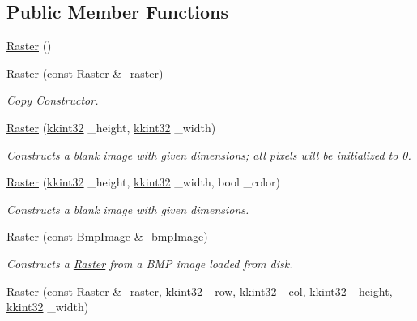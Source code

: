 \subsection*{Public Member Functions}
\begin{DoxyCompactItemize}
\item 
\hyperlink{class_k_k_b_1_1_raster_a19ec88efff547c1fcda863172fef620b}{Raster} ()
\item 
\hyperlink{class_k_k_b_1_1_raster_a711646f50218428dc3ce40eb2b7014c9}{Raster} (const \hyperlink{class_k_k_b_1_1_raster}{Raster} \&\+\_\+raster)
\begin{DoxyCompactList}\small\item\em Copy Constructor. \end{DoxyCompactList}\item 
\hyperlink{class_k_k_b_1_1_raster_aabf6eb169caf874fef8e8880d63c70eb}{Raster} (\hyperlink{namespace_k_k_b_a8fa4952cc84fda1de4bec1fbdd8d5b1b}{kkint32} \+\_\+height, \hyperlink{namespace_k_k_b_a8fa4952cc84fda1de4bec1fbdd8d5b1b}{kkint32} \+\_\+width)
\begin{DoxyCompactList}\small\item\em Constructs a blank image with given dimensions; all pixels will be initialized to 0. \end{DoxyCompactList}\item 
\hyperlink{class_k_k_b_1_1_raster_a356f9c8e73cf2f6e11bfe08eadb039bb}{Raster} (\hyperlink{namespace_k_k_b_a8fa4952cc84fda1de4bec1fbdd8d5b1b}{kkint32} \+\_\+height, \hyperlink{namespace_k_k_b_a8fa4952cc84fda1de4bec1fbdd8d5b1b}{kkint32} \+\_\+width, bool \+\_\+color)
\begin{DoxyCompactList}\small\item\em Constructs a blank image with given dimensions. \end{DoxyCompactList}\item 
\hyperlink{class_k_k_b_1_1_raster_a8fb1de49421cb676e585add96a6a5264}{Raster} (const \hyperlink{class_k_k_b_1_1_bmp_image}{Bmp\+Image} \&\+\_\+bmp\+Image)
\begin{DoxyCompactList}\small\item\em Constructs a \hyperlink{class_k_k_b_1_1_raster}{Raster} from a B\+MP image loaded from disk. \end{DoxyCompactList}\item 
\hyperlink{class_k_k_b_1_1_raster_a882eafd0b7a2c59bf95184d141c4f76c}{Raster} (const \hyperlink{class_k_k_b_1_1_raster}{Raster} \&\+\_\+raster, \hyperlink{namespace_k_k_b_a8fa4952cc84fda1de4bec1fbdd8d5b1b}{kkint32} \+\_\+row, \hyperlink{namespace_k_k_b_a8fa4952cc84fda1de4bec1fbdd8d5b1b}{kkint32} \+\_\+col, \hyperlink{namespace_k_k_b_a8fa4952cc84fda1de4bec1fbdd8d5b1b}{kkint32} \+\_\+height, \hyperlink{namespace_k_k_b_a8fa4952cc84fda1de4bec1fbdd8d5b1b}{kkint32} \+\_\+width)

\end{DoxyCompactItemize}
